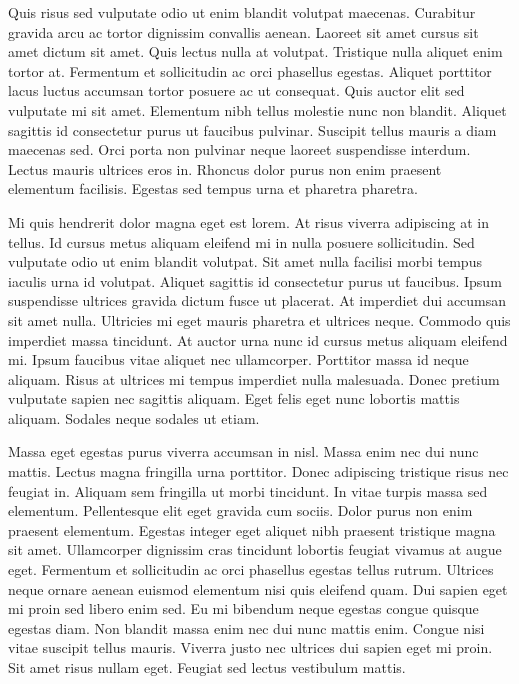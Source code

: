 \documentclass[a4paper,12pt,oneside]{article}
\begin{document}
Quis risus sed vulputate odio ut enim blandit volutpat maecenas. Curabitur gravida arcu ac tortor dignissim convallis aenean. Laoreet sit amet cursus sit amet dictum sit amet. Quis lectus nulla at volutpat. Tristique nulla aliquet enim tortor at. Fermentum et sollicitudin ac orci phasellus egestas. Aliquet porttitor lacus luctus accumsan tortor posuere ac ut consequat. Quis auctor elit sed vulputate mi sit amet. Elementum nibh tellus molestie nunc non blandit. Aliquet sagittis id consectetur purus ut faucibus pulvinar. Suscipit tellus mauris a diam maecenas sed. Orci porta non pulvinar neque laoreet suspendisse interdum. Lectus mauris ultrices eros in. Rhoncus dolor purus non enim praesent elementum facilisis. Egestas sed tempus urna et pharetra pharetra.

Mi quis hendrerit dolor magna eget est lorem. At risus viverra adipiscing at in tellus. Id cursus metus aliquam eleifend mi in nulla posuere sollicitudin. Sed vulputate odio ut enim blandit volutpat. Sit amet nulla facilisi morbi tempus iaculis urna id volutpat. Aliquet sagittis id consectetur purus ut faucibus. Ipsum suspendisse ultrices gravida dictum fusce ut placerat. At imperdiet dui accumsan sit amet nulla. Ultricies mi eget mauris pharetra et ultrices neque. Commodo quis imperdiet massa tincidunt. At auctor urna nunc id cursus metus aliquam eleifend mi. Ipsum faucibus vitae aliquet nec ullamcorper. Porttitor massa id neque aliquam. Risus at ultrices mi tempus imperdiet nulla malesuada. Donec pretium vulputate sapien nec sagittis aliquam. Eget felis eget nunc lobortis mattis aliquam. Sodales neque sodales ut etiam.

Massa eget egestas purus viverra accumsan in nisl. Massa enim nec dui nunc mattis. Lectus magna fringilla urna porttitor. Donec adipiscing tristique risus nec feugiat in. Aliquam sem fringilla ut morbi tincidunt. In vitae turpis massa sed elementum. Pellentesque elit eget gravida cum sociis. Dolor purus non enim praesent elementum. Egestas integer eget aliquet nibh praesent tristique magna sit amet. Ullamcorper dignissim cras tincidunt lobortis feugiat vivamus at augue eget. Fermentum et sollicitudin ac orci phasellus egestas tellus rutrum. Ultrices neque ornare aenean euismod elementum nisi quis eleifend quam. Dui sapien eget mi proin sed libero enim sed. Eu mi bibendum neque egestas congue quisque egestas diam. Non blandit massa enim nec dui nunc mattis enim. Congue nisi vitae suscipit tellus mauris. Viverra justo nec ultrices dui sapien eget mi proin. Sit amet risus nullam eget. Feugiat sed lectus vestibulum mattis.
\end{document}
